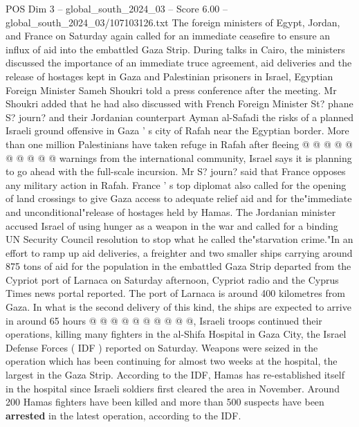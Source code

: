 \begin{textsample}{POS Dim 3 – global\_south\_2024\_03 – Score 6.00 – global\_south\_2024\_03/107103126.txt}
The foreign ministers of Egypt, Jordan, and France on Saturday again called for an immediate ceasefire to ensure an influx of aid into the embattled Gaza Strip.
During talks in Cairo, the ministers discussed the importance of an immediate truce agreement, aid deliveries and the release of hostages kept in Gaza and Palestinian prisoners in Israel, Egyptian Foreign Minister Sameh Shoukri told a press conference after the meeting.
Mr Shoukri added that he had also discussed with French Foreign Minister St? phane S? journ? and their Jordanian counterpart Ayman al-Safadi the risks of a planned Israeli ground offensive in Gaza ' s city of Rafah near the Egyptian border.
More than one million Palestinians have taken refuge in Rafah after fleeing @ @ @ @ @ @ @ @ @ @ warnings from the international community, Israel says it is planning to go ahead with the full-scale incursion.
Mr S? journ? said that France opposes any military action in Rafah.
France ' s top diplomat also called for the opening of land crossings to give Gaza access to adequate relief aid and for the"immediate and unconditional"release of hostages held by Hamas.
The Jordanian minister accused Israel of using hunger as a weapon in the war and called for a binding UN Security Council resolution to stop what he called the"starvation crime."In an effort to ramp up aid deliveries, a freighter and two smaller ships carrying around 875 tons of aid for the population in the embattled Gaza Strip departed from the Cypriot port of Larnaca on Saturday afternoon, Cypriot radio and the Cyprus Times news portal reported.
The port of Larnaca is around 400 kilometres from Gaza.
In what is the second delivery of this kind, the ships are expected to arrive in around 65 hours @ @ @ @ @ @ @ @ @ @, Israeli troops continued their operations, killing many fighters in the al-Shifa Hospital in Gaza City, the Israel Defense Forces ( IDF ) reported on Saturday.
Weapons were seized in the operation which has been continuing for almost two weeks at the hospital, the largest in the Gaza Strip.
According to the IDF, Hamas has re-established itself in the hospital since Israeli soldiers first cleared the area in November.
Around 200 Hamas fighters have been killed and more than 500 suspects have been \textbf{arrested} in the latest operation, according to the IDF.

\end{textsample}
